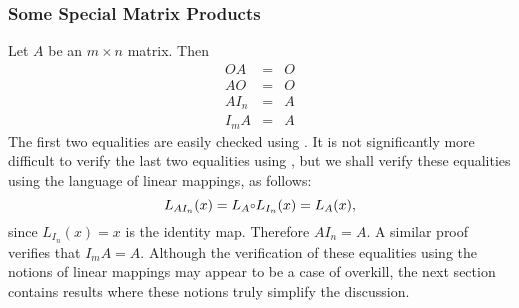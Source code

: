 \documentclass{ximera}
\begin{document}
\subsubsection*{Some Special Matrix Products}

Let $A$ be an $m\times n$ matrix.  Then
\begin{eqnarray*}
OA & = & O \\
AO & = & O \\
AI_n & = & A \\
I_mA & = & A
\end{eqnarray*}
The first two equalities are easily checked using .
It is not significantly more difficult to verify the last two
equalities using , but we shall verify these
equalities using the language of linear mappings, as follows:
\[
L_{AI_n}(x)=L_A\compose L_{I_n}(x)=L_A(x),
\]
since $L_{I_n}(x)=x$ is the identity map.  Therefore $AI_n=A$.
A similar proof verifies that $I_mA=A$.  Although the
verification of these equalities using the notions of linear
mappings may appear to be a case of overkill, the next section
contains results where these notions truly simplify the discussion.

\EXER

\TEXER
\end{document}
